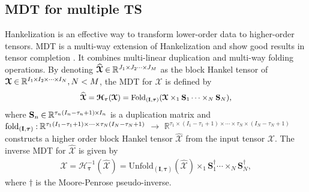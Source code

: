 \documentclass[letterpaper]{article} %
\numberwithin{theorem}{section}
\newcommand{\bm}{\boldsymbol}
\newcommand{\ten}[1]{ \boldsymbol{\mathcal #1}}
\newcommand{\bbR}[1]{\mathbb{R}^{#1}}
\begin{document}
\subsection{MDT for multiple  TS}
Hankelization is an effective way to transform  lower-order data to higher-order tensors.  MDT is a multi-way extension of Hankelization  and show good results in tensor completion  \cite{yokota2018missing,yokota2019manifold}. It combines  multi-linear duplication and multi-way folding operations.  By denoting $\widehat{\ten{X}}\hspace{-0.02cm}  \in \hspace{-0.02cm} \mathbb{R}^{J_1 \times\hspace{-0.02cm}  J_2 \hspace{-0.02cm} \cdots\hspace{-0.02cm}  \times\hspace{-0.02cm}  J_M}$ as the block Hankel tensor of   $\ten{X}\hspace{-0.02cm}   \in\hspace{-0.02cm}   \bbR{I_1 \hspace{-0.02cm}  \times \hspace{-0.02cm}  I_2 \hspace{-0.02cm}  \times\hspace{-0.02cm}   \cdots\hspace{-0.02cm}   \times \hspace{-0.02cm}  I_N}, N < M$, the  MDT  for  $\ten{X}$  is defined by
\begin{equation}\label{MDT}
\small
\begin{aligned}
\widehat{\ten{X}} =\ten{H}_{\bm \tau}(\ten{X}) = \text{Fold}_{(\mathbf I, \bm \tau)} ( \ten{X} \times_1 \mathbf S_1 \cdots \times_N \mathbf S_N),
\end{aligned}
\end{equation}
where $\mathbf S_n\hspace{-0.02cm}  \in \hspace{-0.02cm}  \mathbb{R}^{\tau_n(I_n-\tau_n+1) \hspace{-0.02cm}  \times\hspace{-0.02cm}  I_n}$ is a duplication matrix  and  $\text{fold}_{(\mathbf I, \bm \tau)}\hspace{-0.02cm} :\hspace{-0.02cm}  \bbR{\tau_1(I_1-\tau_1+1) \times \cdots \times \tau_N(I_N-\tau_N+1)}$ $\rightarrow$ $\bbR{\tau_1 \times (I_1-\tau_1+1) \times \cdots \times \tau_N \times (I_N-\tau_N+1)}$ constructs a higher order block Hankel tensor $\widehat{ \ten{X}}$ from the input  tensor ${ \ten{X}}$.   The inverse MDT for  $\widehat{ \ten{X}}$ is given by
\begin{equation}
\begin{aligned}
{\ten{X}} = \mathcal{H}_{\bm \tau}^{-1}(\widehat{ \ten{X}}) = \text{Unfold}_{(\mathbf I, \bm \tau)}(\widehat{ \ten{X}}) \times_1 \mathbf S_1^\dagger \cdots \times_N \mathbf S_N^\dagger,
\end{aligned}
\end{equation}
where $\dagger$ is the  Moore-Penrose pseudo-inverse.
\end{document}
